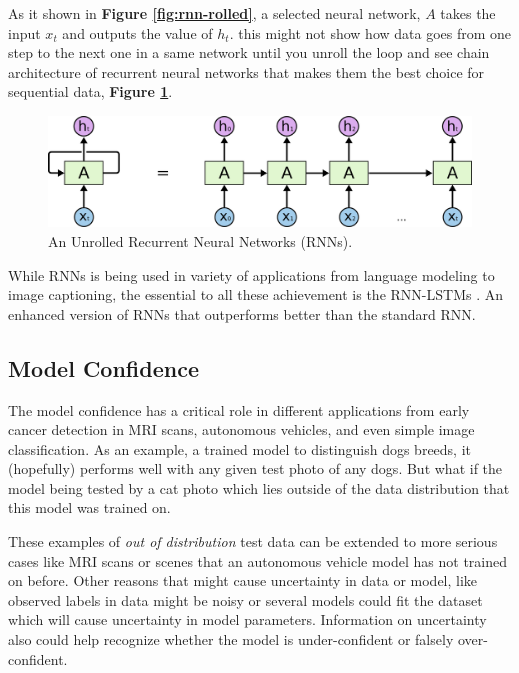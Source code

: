 As it shown in \textbf{Figure \ref{fig:rnn-rolled}}, a selected neural network, $A$ takes the input $x_t$ and outputs the value of $h_t$. this might not show how data goes from one step to the next one in a same network until you unroll the loop and see chain architecture of recurrent neural networks that makes them the best choice for sequential data, \textbf{Figure \ref{fig:rnn-unrolled}}.

\begin{figure}[p]
	\centering
	\includegraphics[scale=0.4]{./figs/rnn-unrolled}
	\caption[An Unrolled Recurrent Neural Networks]{An Unrolled Recurrent Neural Networks (RNNs).}
	\label{fig:rnn-unrolled}
\end{figure}

While RNNs is being used in variety of applications from language modeling to image captioning, the essential to all these achievement is the RNN-LSTMs \cite{Hochreiter1997}. An enhanced version of RNNs that outperforms better than the standard RNN.

\subsection{Model Confidence}
The model confidence has a critical role in different applications from early cancer detection in MRI scans, autonomous vehicles, and even simple image classification.
As an example, a trained model to distinguish dogs breeds,
it (hopefully) performs well with any given test photo of any dogs. But what if the model being tested by a cat photo which lies outside of the data distribution that this model was trained on.

These examples of \textit{out of distribution} test data can be extended to more serious cases like MRI scans or scenes that an autonomous vehicle model has not trained on before.
Other reasons that might cause uncertainty in data or model, like observed labels in data might be noisy or several models could fit the dataset which will cause uncertainty in model parameters.
Information on uncertainty also could help recognize whether the model is under-confident or falsely over-confident.


